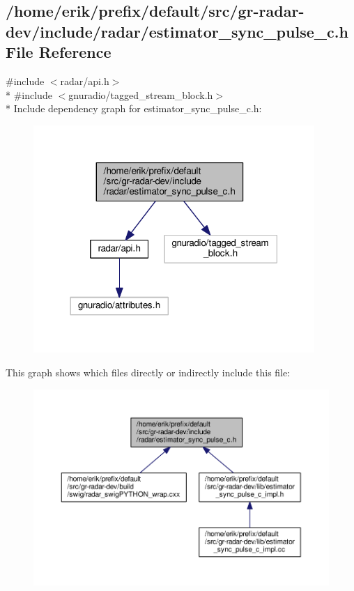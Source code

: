\subsection{/home/erik/prefix/default/src/gr-\/radar-\/dev/include/radar/estimator\+\_\+sync\+\_\+pulse\+\_\+c.h File Reference}
\label{estimator__sync__pulse__c_8h}
{\ttfamily \#include $<$radar/api.\+h$>$}\\*
{\ttfamily \#include $<$gnuradio/tagged\+\_\+stream\+\_\+block.\+h$>$}\\*
Include dependency graph for estimator\+\_\+sync\+\_\+pulse\+\_\+c.\+h\+:
\nopagebreak
\begin{figure}[H]
\begin{center}
\leavevmode
\includegraphics[width=302pt]{d5/dac/estimator__sync__pulse__c_8h__incl}
\end{center}
\end{figure}
This graph shows which files directly or indirectly include this file\+:
\nopagebreak
\begin{figure}[H]
\begin{center}
\leavevmode
\includegraphics[width=350pt]{d3/d7d/estimator__sync__pulse__c_8h__dep__incl}
\end{center}
\end{figure}
